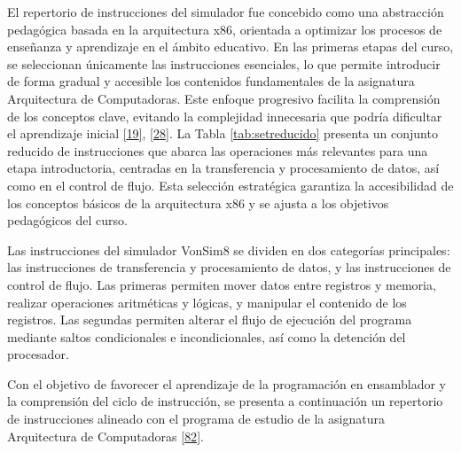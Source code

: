 \documentclass[12pt,oneside]{templates/unerthesis}
\begin{document}
El repertorio de instrucciones del simulador fue concebido como una abstracción pedagógica basada en la arquitectura x86, orientada a optimizar los procesos de enseñanza y aprendizaje en el ámbito educativo. En las primeras etapas del curso, se seleccionan únicamente las instrucciones esenciales, lo que permite introducir de forma gradual y accesible los contenidos fundamentales de la asignatura Arquitectura de Computadoras. Este enfoque progresivo facilita la comprensión de los conceptos clave, evitando la complejidad innecesaria que podría dificultar el aprendizaje inicial \protect\hyperlink{ref-hennessy2017computer}{{[}19{]}}, \protect\hyperlink{ref-tanenbaum_structured_2016}{{[}28{]}}. La Tabla \ref{tab:setreducido} presenta un conjunto reducido de instrucciones que abarca las operaciones más relevantes para una etapa introductoria, centradas en la transferencia y procesamiento de datos, así como en el control de flujo. Esta selección estratégica garantiza la accesibilidad de los conceptos básicos de la arquitectura x86 y se ajusta a los objetivos pedagógicos del curso.

Las instrucciones del simulador VonSim8 se dividen en dos categorías principales: las instrucciones de transferencia y procesamiento de datos, y las instrucciones de control de flujo. Las primeras permiten mover datos entre registros y memoria, realizar operaciones aritméticas y lógicas, y manipular el contenido de los registros. Las segundas permiten alterar el flujo de ejecución del programa mediante saltos condicionales e incondicionales, así como la detención del procesador.

Con el objetivo de favorecer el aprendizaje de la programación en ensamblador y la comprensión del ciclo de instrucción, se presenta a continuación un repertorio de instrucciones alineado con el programa de estudio de la asignatura Arquitectura de Computadoras \protect\hyperlink{ref-cd023_25_programa2025}{{[}82{]}}.
\end{document}
